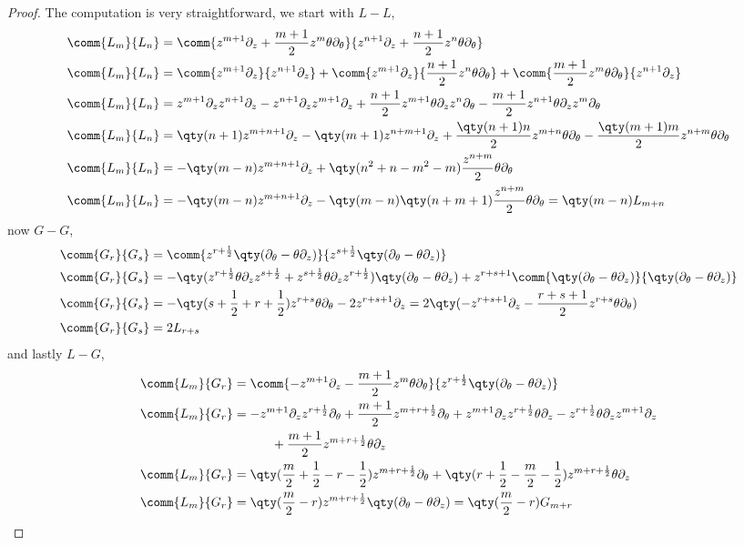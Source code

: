 \begin{proof}
    The computation is very straightforward, we start with $L-L$,
    \begin{align*}
        \comm{L_m}{L_n}&=\comm{z^{m+1}\partial_z+\frac{m+1}{2}z^m\theta\partial_\theta}{z^{n+1}\partial_z+\frac{n+1}{2}z^n\theta\partial_\theta}\\
        \comm{L_m}{L_n}&=\comm{z^{m+1}\partial_z}{z^{n+1}\partial_z}+\comm{z^{m+1}\partial_z}{\frac{n+1}{2}z^n\theta\partial_\theta}+\comm{\frac{m+1}{2}z^m\theta\partial_\theta}{z^{n+1}\partial_z}\\
        \comm{L_m}{L_n}&=z^{m+1}\partial_zz^{n+1}\partial_z-z^{n+1}\partial_zz^{m+1}\partial_z+\frac{n+1}{2}z^{m+1}\theta\partial_zz^n\partial_\theta-\frac{m+1}{2}z^{n+1}\theta\partial_zz^m\partial_\theta\\
        \comm{L_m}{L_n}&=\qty(n+1)z^{m+n+1}\partial_z-\qty(m+1)z^{n+m+1}\partial_z+\frac{\qty(n+1)n}{2}z^{m+n}\theta\partial_\theta-\frac{\qty(m+1)m}{2}z^{n+m}\theta\partial_\theta\\
        \comm{L_m}{L_n}&=-\qty(m-n)z^{m+n+1}\partial_z+\qty(n^2+n-m^2-m)\frac{z^{n+m}}{2}\theta\partial_\theta\\
        \comm{L_m}{L_n}&=-\qty(m-n)z^{m+n+1}\partial_z-\qty(m-n)\qty(n+m+1)\frac{z^{n+m}}{2}\theta\partial_\theta=\qty(m-n)L_{m+n}
    \end{align*}
    now $G-G$,
    \begin{align*}
        \comm{G_r}{G_s}&=\comm{z^{r+\frac12}\qty(\partial_\theta-\theta\partial_z)}{z^{s+\frac12}\qty(\partial_\theta-\theta\partial_z)}\\
        \comm{G_r}{G_s}&=-\qty(z^{r+\frac12}\theta\partial_z z^{s+\frac12}+z^{s+\frac12}\theta\partial_z z^{r+\frac12})\qty(\partial_\theta-\theta\partial_z)+z^{r+s+1}\comm{\qty(\partial_\theta-\theta\partial_z)}{\qty(\partial_\theta-\theta\partial_z)}\\
        \comm{G_r}{G_s}&=-\qty(s+\frac12+r+\frac12)z^{r+s}\theta\partial_\theta-2z^{r+s+1}\partial_z=2\qty(-z^{r+s+1}\partial_z-\frac{r+s+1}{2}z^{r+s}\theta\partial_\theta)\\
        \comm{G_r}{G_s}&=2L_{r+s}
    \end{align*}
    and lastly $L-G$,
    \begin{align*}
        \comm{L_m}{G_r}&=\comm{-z^{m+1}\partial_z-\frac{m+1}{2}z^m\theta\partial_\theta}{z^{r+\frac12}\qty(\partial_\theta-\theta\partial_z)}\\
        \comm{L_m}{G_r}&=-z^{m+1}\partial_z z^{r+\frac12}\partial_\theta+\frac{m+1}{2}z^{m+r+\frac12}\partial_\theta+z^{m+1}\partial_z z^{r+\frac12}\theta\partial_z-z^{r+\frac12}\theta\partial_zz^{m+1}\partial_z\\
        &\quad\quad\quad+\frac{m+1}{2}z^{m+r+\frac12}\theta\partial_z\\
        \comm{L_m}{G_r}&=\qty(\frac m2+\frac12 -r-\frac12)z^{m+r+\frac12}\partial_\theta+\qty(r+\frac12-\frac m2 -\frac12)z^{m+r+\frac12}\theta\partial_z\\
        \comm{L_m}{G_r}&=\qty(\frac m2-r)z^{m+r+\frac12}\qty(\partial_\theta-\theta\partial_z)=\qty(\frac m2-r)G_{m+r}
    \end{align*}
\end{proof}
